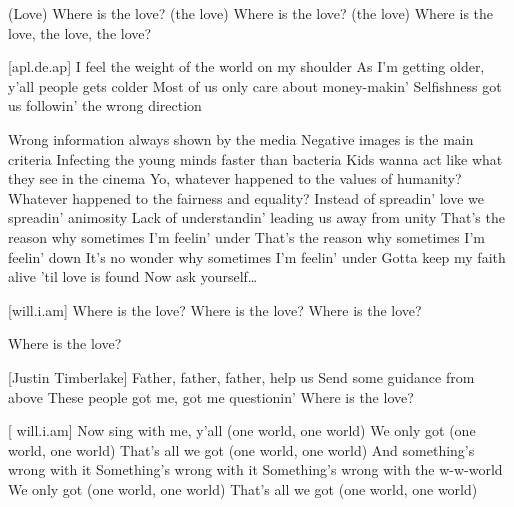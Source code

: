 \begin{guitar}
(Love) Where is the love? (the love)
Where is the love? (the love)
Where is the love, the love, the love?

[apl.de.ap]
I feel the weight of the world on my shoulder
As I'm getting older, y'all people gets colder
Most of us only care about money-makin'
Selfishness got us followin' the wrong direction

Wrong information always shown by the media
Negative images is the main criteria
Infecting the young minds faster than bacteria
Kids wanna act like what they see in the cinema
Yo, whatever happened to the values of humanity?
Whatever happened to the fairness and equality?
Instead of spreadin' love we spreadin' animosity
Lack of understandin' leading us away from unity
That's the reason why sometimes I'm feelin' under
That's the reason why sometimes I'm feelin' down
It's no wonder why sometimes I'm feelin' under
Gotta keep my faith alive 'til love is found
Now ask yourself…

[will.i.am]
Where is the love?
Where is the love?
Where is the love?

Where is the love?

[Justin Timberlake]
Father, father, father, help us
Send some guidance from above
These people got me, got me questionin'
Where is the love?

[ will.i.am]
Now sing with me, y'all (one world, one world)
We only got (one world, one world)
That's all we got (one world, one world)
And something's wrong with it
Something's wrong with it
Something's wrong with the w-w-world
We only got (one world, one world)
That's all we got (one world, one world) 

\end{guitar}